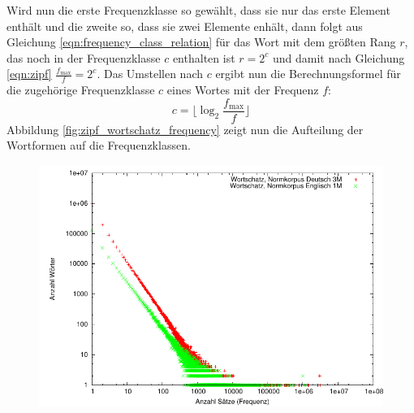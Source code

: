 Wird nun die erste Frequenzklasse so gewählt, dass sie nur das erste Element enthält und die zweite so, dass sie zwei Elemente enhält, dann folgt aus Gleichung \ref{eqn:frequency_class_relation}
für das Wort mit dem größten Rang $r$, das noch in der Frequenzklasse $c$ enthalten ist $r = 2^c$ und damit nach Gleichung \ref{eqn:zipf} $\frac{f_{\max}}{f} = 2^c$.
Das Umstellen nach $c$ ergibt nun die Berechnungsformel für die zugehörige Frequenzklasse $c$ eines Wortes mit der Frequenz $f$:
\begin{equation}
c = \lfloor\log_2 \frac{f_{\max}}{f}\rfloor
\end{equation}
Abbildung \ref{fig:zipf_wortschatz_frequency} zeigt nun die Aufteilung der Wortformen auf die Frequenzklassen.

\begin{figure}[tbh]
\includegraphics[width=\textwidth]{img/pdf/powerlaw_wortschatz.pdf}
\label{fig:powerlaw_wortschatz}
\end{figure}

